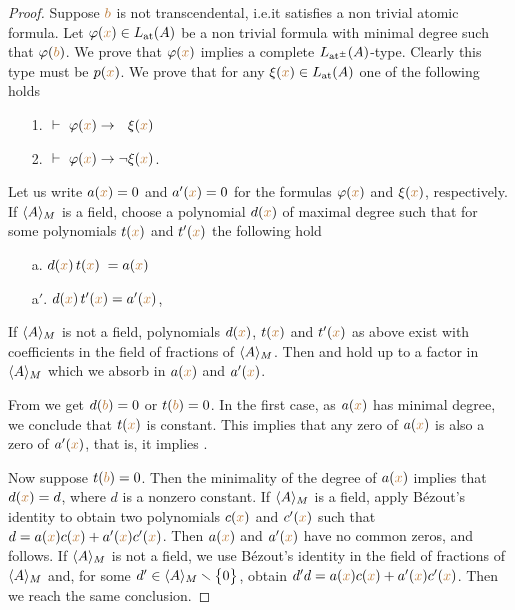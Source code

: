 \begin{proof}
Suppose ${\color{brown} b}$ is not transcendental, i.e.\@ it satisfies a non trivial atomic formula.
%
Let $\varphi({\color{brown} x})\in L_{\rm at}(A)$ be a non trivial formula with minimal degree such that $\varphi({\color{brown} b})$.
%
We prove that $\varphi({\color{brown} x})$ implies a complete $L_{\rm at^\pm}(A)$-type.
%
Clearly this type must be $p({\color{brown} x})$.
%
We prove that for any $\xi({\color{brown} x})\in L_{\rm at}(A)$ one of the following holds
\begin{itemize}
\item[1.] $\ \proves\ \phi({\mr x})\imp\phantom{\neg}\xi({\mr x})$
\item[2.] $\ \proves\ \phi({\mr x})\imp\neg\xi({\mr x})$.
\end{itemize} 
Let us write $a({\color{brown} x})=0$ and $a'({\color{brown} x})=0$ for the formulas $\varphi({\color{brown} x})$ and $\xi({\color{brown} x})$, respectively.
%
If $\langle A\rangle_M$ is a field, choose a polynomial $d({\color{brown} x})$ of maximal degree such that for some polynomials $t({\color{brown} x})$ and $t'({\color{brown} x})$ the following hold
\begin{itemize}
\item[a.] $d({\color{brown} x})\,t({\color{brown} x})\;=a({\color{brown} x})$
\item[a$'$.] $d({\color{brown} x})\,t'({\color{brown} x})=a'({\color{brown} x})$,
\end{itemize}

If $\langle A\rangle_M$ is not a field, polynomials $d({\color{brown} x})$, $t({\color{brown} x})$ and $t'({\color{brown} x})$ as above exist with coefficients in the field of fractions of $\langle A\rangle_M$.
%
Then  and  hold up to a factor in $\langle A\rangle_M$ which we absorb in $a({\color{brown} x})$ and $a'({\color{brown} x})$.

From  we get $d({\color{brown} b})=0$ or $t({\color{brown} b})=0$.
%
In the first case, as $a({\color{brown} x})$ has minimal degree, we conclude that $t({\color{brown} x})$ is constant.
%
This implies that any zero of $a({\color{brown} x})$ is also a zero of $a'({\color{brown} x})$, that is, it implies .

Now suppose $t({\color{brown} b})=0$.
%
Then the minimality of the degree of $a({\color{brown} x})$ implies that $d({\color{brown} x})=d$, where $d$ is a nonzero constant.
%
If $\langle A\rangle_M$ is a field, apply B\'ezout's identity to obtain two polynomials $c({\color{brown} x})$ and $c'({\color{brown} x})$ such that $d=a({\color{brown} x})c({\color{brown} x})+a'({\color{brown} x})c'({\color{brown} x})$.
%
Then $a({\color{brown} x})$ and $a'({\color{brown} x})$ have no common zeros, and  follows.
%
If $\langle A\rangle_M$ is not a field, we use  B\'ezout's identity in the field of fractions of $\langle A\rangle_M$ and, for some $d'\in\langle A\rangle_M\smallsetminus\big\{0\big\}$, obtain $d'd=a({\color{brown} x})c({\color{brown} x})+a'({\color{brown} x})c'({\color{brown} x})$.
%
Then we reach the same conclusion.
\end{proof}


